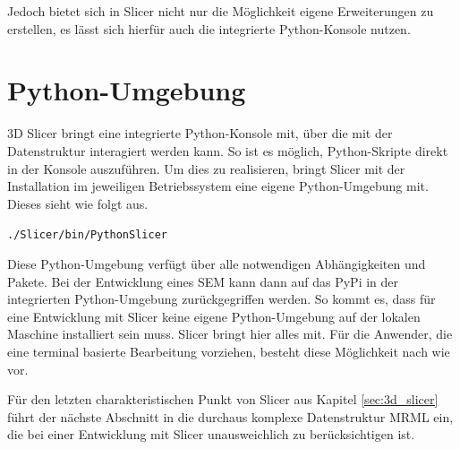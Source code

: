 Jedoch bietet sich in Slicer nicht nur die Möglichkeit eigene Erweiterungen zu erstellen,
es lässt sich hierfür auch die integrierte Python-Konsole nutzen.

\section{Python-Umgebung}
\label{subsec:pythob_umgebung} 3D Slicer bringt eine integrierte Python-Konsole
mit, über die mit der Datenstruktur interagiert werden kann. So ist es möglich, Python-Skripte
direkt in der Konsole auszuführen. Um dies zu realisieren, bringt Slicer mit der
Installation im jeweiligen Betriebssystem eine eigene Python-Umgebung mit.
Dieses sieht wie folgt aus.

\begin{center}
	\texttt{./Slicer/bin/PythonSlicer}
\end{center}

Diese Python-Umgebung verfügt über alle notwendigen Abhängigkeiten und Pakete.
Bei der Entwicklung eines \ac{SEM} kann dann auf das \ac{PyPi} in der
integrierten Python-Umgebung zurückgegriffen werden. So kommt es, dass für eine
Entwicklung mit Slicer keine eigene Python-Umgebung auf der lokalen Maschine
installiert sein muss. Slicer bringt hier alles mit. Für die Anwender, die eine terminal
basierte Bearbeitung vorziehen, besteht diese Möglichkeit nach wie vor.

Für den letzten charakteristischen Punkt von Slicer aus Kapitel
\ref{sec:3d_slicer} führt der nächste Abschnitt in die durchaus komplexe
Datenstruktur \ac{MRML} ein, die bei einer Entwicklung mit Slicer unausweichlich
zu berücksichtigen ist.

